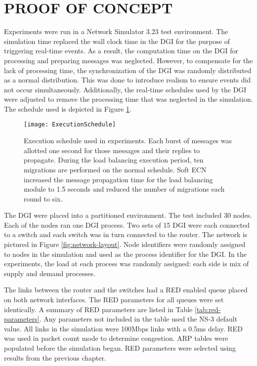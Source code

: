 \section{PROOF OF CONCEPT}
\label{sect:experimentalsetup}
Experiments were run in a Network Simulator 3.23\cite{NS3} test environment.
The simulation time replaced the wall clock time in the \ac{DGI} for the purpose of triggering real-time events.
As a result, the computation time on the \ac{DGI} for processing and preparing messages was neglected.
However, to compensate for the lack of processing time, the synchronization of the \ac{DGI} was randomly distributed as a normal distribution.
This was done to introduce realism to ensure events did not occur simultaneously.
Additionally, the real-time schedules used by the \ac{DGI} were adjusted to remove the processing time that was neglected in the simulation.
The schedule used is depicted in Figure \ref{fig:execution-schedule}.

\begin{figure}
\centering
\texttt{[image: ExecutionSchedule]}
\caption[Execution schedule used in experiments.]{Execution schedule used in experiments. Each burst of messages was allotted one second for those messages and their replies to propagate. During the load balancing execution period, ten migrations are performed on the normal schedule. Soft ECN increased the message propagation time for the load balancing module to 1.5 seconds and reduced the number of migrations each round to six.}
\label{fig:execution-schedule}
\end{figure}

The \ac{DGI} were placed into a partitioned environment.
The test included 30 nodes.
Each of the nodes ran one \ac{DGI} process.
Two sets of 15 \ac{DGI} were each connected to a switch and each switch was in turn connected to the router.
The network is pictured in Figure \ref{fig:network-layout}.
Node identifiers were randomly assigned to nodes in the simulation and used as the process identifier for the \ac{DGI}.
In the experiments, the load at each process was randomly assigned: each side is mix of supply and demand processes.

The links between the router and the switches had a \ac{RED} enabled queue placed on both network interfaces.
The \ac{RED} parameters for all queues were set identically.
A summary of \ac{RED} parameters are listed in Table \ref{tab:red-parameters}.
Any parameters not included in the table used the NS-3 default value.
All links in the simulation were 100Mbps links with a 0.5ms delay.
RED was used in packet count mode to determine congestion.
ARP tables were populated before the simulation began.
\ac{RED} parameters were selected using results from the previous chapter.

